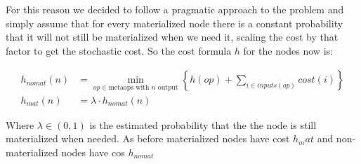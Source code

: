 For this reason we decided to follow a pragmatic approach to the
problem and simply assume that for every materialized node there is a
constant probability that it will not still be materialized when we
need it, scaling the cost by that factor to get the stochastic
cost. So the cost formula \(h\) for the nodes now is:

\begin{align*}
  h_{nomat}(n) &= \min\limits_{op \in \text{metaops with \(n\) output}} \left\{ h(op) + \sum\limits_{i \in inputs(op)} cost(i)  \right\} \\
  h_{mat}(n) &= \lambda \cdot h_{nomat}(n)
\end{align*}

Where \(\lambda \in (0,1)\) is the estimated probability that the the
node is still materialized when needed. As before materialized nodes
have cost \(h_mat\) and non-materialized nodes have cos \(h_{nomat}\)
